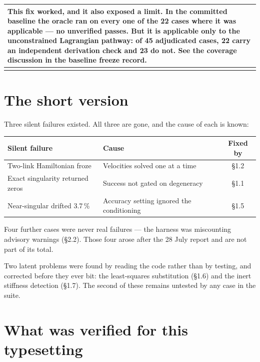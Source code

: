 \documentclass[11pt,a4paper]{article}
\makeatletter
\newenvironment{callout}
  {\par\medskip\noindent\begin{tabular}{@{}p{0.94\textwidth}@{}}
   \arrayrulecolor{warnrule}\hline\rule{0pt}{2.6ex}}
  {\\[0.8ex]\hline\arrayrulecolor{black}\end{tabular}\par\medskip}
\makeatother
\begin{document}
\begin{callout}
\textbf{This fix worked, and it also exposed a limit.} In the committed
baseline the oracle ran on every one of the 22 cases where it was applicable
--- no unverified passes. But it is applicable only to the unconstrained
Lagrangian pathway: of 45 adjudicated cases, 22 carry an independent derivation
check and 23 do not. See the coverage discussion in the baseline freeze record.
\end{callout}

\section{The short version}\label{sec:short}

Three silent failures existed. All three are gone, and the cause of each is
known:

\begin{center}
\begin{tabular}{@{}L{0.30\textwidth}L{0.36\textwidth}c@{}}
\toprule
\textbf{Silent failure} & \textbf{Cause} & \textbf{Fixed by} \\
\midrule
Two-link Hamiltonian froze        & Velocities solved one at a time            & \S1.2 \\
Exact singularity returned zeros  & Success not gated on degeneracy            & \S1.1 \\
Near-singular drifted 3.7\,\%     & Accuracy setting ignored the conditioning  & \S1.5 \\
\bottomrule
\end{tabular}
\end{center}

\noindent Four further cases were never real failures --- the harness was
miscounting advisory warnings (\S2.2). Those four arose after the 28 July
report and are not part of its total.

Two latent problems were found by reading the code rather than by testing, and
corrected before they ever bit: the least-squares substitution (\S1.6) and the
inert stiffness detection (\S1.7). The second of these remains untested by any
case in the suite.

\section{What was verified for this typesetting}\label{sec:verif}
\end{document}
